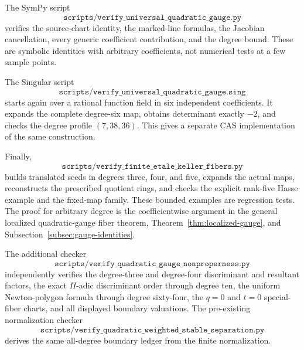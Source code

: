 The SymPy script
\[
 \texttt{scripts/verify\_universal\_quadratic\_gauge.py}
\]
verifies the source-chart identity, the marked-line formulas, the Jacobian
cancellation, every generic coefficient contribution, and the degree bound.
These are symbolic identities with arbitrary coefficients, not numerical
tests at a few sample points.

The Singular script
\[
 \texttt{scripts/verify\_universal\_quadratic\_gauge.sing}
\]
starts again over a rational function field in six independent coefficients.
It expands the complete degree-six map, obtains determinant exactly $-2$, and
checks the degree profile $(7,38,36)$.  This gives a separate CAS
implementation of the same construction.

Finally,
\[
 \texttt{scripts/verify\_finite\_etale\_keller\_fibers.py}
\]
builds translated seeds in degrees three, four, and five, expands the actual
maps, reconstructs the prescribed quotient rings, and checks the explicit
rank-five Hasse example and the fixed-map family.  These bounded examples are
regression tests.  The proof for arbitrary degree is the coefficientwise
argument in the general localized quadratic-gauge fiber theorem,
Theorem~\ref{thm:localized-gauge}, and
Subsection~\ref{subsec:gauge-identities}.

The additional checker
\[
 \texttt{scripts/verify\_quadratic\_gauge\_nonproperness.py}
\]
independently verifies the degree-three and degree-four discriminant and
resultant factors, the exact \(\Pi\)-adic discriminant order through degree
ten, the uniform Newton-polygon formula through degree sixty-four, the
\(q=0\) and \(t=0\) special-fiber charts, and all displayed boundary
valuations.  The pre-existing normalization checker
\[
 \texttt{scripts/verify\_quadratic\_weighted\_stable\_separation.py}
\]
derives the same all-degree boundary ledger from the finite normalization.

